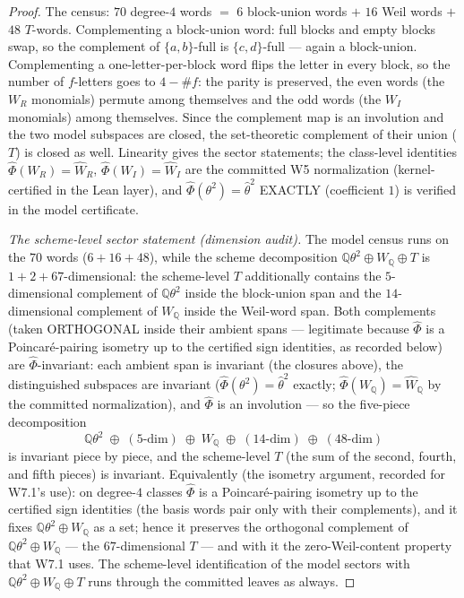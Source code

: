 \documentclass[11pt]{article}
\theoremstyle{definition}
\newcommand{\Q}{\mathbb{Q}}
\newcommand{\WQ}{W_{\Q}}
\newcommand{\FMc}{\widehat\Phi}
\begin{document}
\begin{proof}
The census: $70$ degree-$4$ words $=$ $6$ block-union words $+$ $16$ Weil
words $+$ $48$ $T$-words. Complementing a block-union word: full blocks and
empty blocks swap, so the complement of $\{a,b\}$-full is
$\{c,d\}$-full --- again a block-union. Complementing a one-letter-per-block
word flips the letter in every block, so the number of $f$-letters goes to
$4-\#f$: the parity is preserved, the even words (the $W_R$ monomials)
permute among themselves and the odd words (the $W_I$ monomials) among
themselves. Since the complement map is an involution and the two model
subspaces are closed, the set-theoretic complement of their union ($T$) is
closed as well. Linearity gives the sector statements; the class-level
identities $\FMc(W_R)=\widehat W_R$, $\FMc(W_I)=\widehat W_I$ are the committed
W5 normalization (kernel-certified in the Lean layer), and
$\FMc(\theta^2)=\widehat\theta^2$ EXACTLY (coefficient $1$) is verified in the
model certificate.

\emph{The scheme-level sector statement (dimension audit).} The model
census runs on the $70$ words ($6+16+48$), while the scheme decomposition
$\Q\theta^2\oplus\WQ\oplus T$ is $1+2+67$-dimensional: the scheme-level
$T$ additionally contains the $5$-dimensional complement of $\Q\theta^2$
inside the block-union span and the $14$-dimensional complement of $\WQ$
inside the Weil-word span. Both complements (taken ORTHOGONAL inside their
ambient spans --- legitimate because $\FMc$ is a Poincar\'e-pairing
isometry up to the certified sign identities, as recorded below) are
$\FMc$-invariant: each ambient span is invariant (the closures above), the
distinguished subspaces are invariant ($\FMc(\theta^2)=\widehat\theta^2$
exactly; $\FMc(\WQ)=\widehat\WQ$ by the committed normalization), and
$\FMc$ is an involution --- so the five-piece decomposition
\[
\Q\theta^2\;\oplus\;(\text{5-dim})\;\oplus\;\WQ\;\oplus\;(\text{14-dim})
\;\oplus\;(\text{48-dim})
\]
is invariant piece by piece, and the scheme-level $T$ (the sum of the
second, fourth, and fifth pieces) is invariant. Equivalently (the isometry
argument, recorded for W7.1's use): on degree-$4$ classes $\FMc$ is a
Poincar\'e-pairing isometry up to the certified sign identities (the
basis words pair only with their complements), and it fixes
$\Q\theta^2\oplus\WQ$ as a set; hence it preserves the orthogonal
complement of $\Q\theta^2\oplus\WQ$ --- the $67$-dimensional $T$ --- and
with it the zero-Weil-content property that W7.1 uses. The scheme-level
identification of the model sectors with
$\Q\theta^2\oplus\WQ\oplus T$ runs through the committed leaves as always.
\end{proof}
\end{document}
